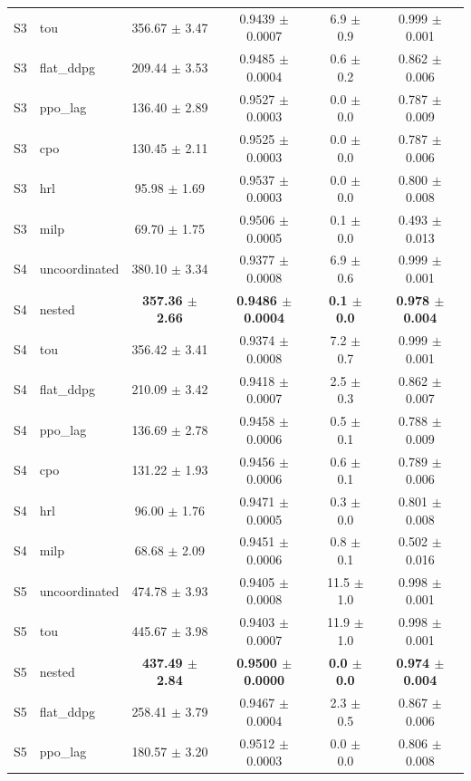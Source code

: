 \begin{tabular}{llcccc}
S3 & tou & 356.67 $\pm$ 3.47 & 0.9439 $\pm$ 0.0007 & 6.9 $\pm$ 0.9 & 0.999 $\pm$ 0.001 \\
S3 & flat_ddpg & 209.44 $\pm$ 3.53 & 0.9485 $\pm$ 0.0004 & 0.6 $\pm$ 0.2 & 0.862 $\pm$ 0.006 \\
S3 & ppo_lag & 136.40 $\pm$ 2.89 & 0.9527 $\pm$ 0.0003 & 0.0 $\pm$ 0.0 & 0.787 $\pm$ 0.009 \\
S3 & cpo & 130.45 $\pm$ 2.11 & 0.9525 $\pm$ 0.0003 & 0.0 $\pm$ 0.0 & 0.787 $\pm$ 0.006 \\
S3 & hrl & 95.98 $\pm$ 1.69 & 0.9537 $\pm$ 0.0003 & 0.0 $\pm$ 0.0 & 0.800 $\pm$ 0.008 \\
S3 & milp & 69.70 $\pm$ 1.75 & 0.9506 $\pm$ 0.0005 & 0.1 $\pm$ 0.0 & 0.493 $\pm$ 0.013 \\
\midrule
S4 & uncoordinated & 380.10 $\pm$ 3.34 & 0.9377 $\pm$ 0.0008 & 6.9 $\pm$ 0.6 & 0.999 $\pm$ 0.001 \\
S4 & nested & \textbf{357.36 $\pm$ 2.66} & \textbf{0.9486 $\pm$ 0.0004} & \textbf{0.1 $\pm$ 0.0} & \textbf{0.978 $\pm$ 0.004} \\
S4 & tou & 356.42 $\pm$ 3.41 & 0.9374 $\pm$ 0.0008 & 7.2 $\pm$ 0.7 & 0.999 $\pm$ 0.001 \\
S4 & flat_ddpg & 210.09 $\pm$ 3.42 & 0.9418 $\pm$ 0.0007 & 2.5 $\pm$ 0.3 & 0.862 $\pm$ 0.007 \\
S4 & ppo_lag & 136.69 $\pm$ 2.78 & 0.9458 $\pm$ 0.0006 & 0.5 $\pm$ 0.1 & 0.788 $\pm$ 0.009 \\
S4 & cpo & 131.22 $\pm$ 1.93 & 0.9456 $\pm$ 0.0006 & 0.6 $\pm$ 0.1 & 0.789 $\pm$ 0.006 \\
S4 & hrl & 96.00 $\pm$ 1.76 & 0.9471 $\pm$ 0.0005 & 0.3 $\pm$ 0.0 & 0.801 $\pm$ 0.008 \\
S4 & milp & 68.68 $\pm$ 2.09 & 0.9451 $\pm$ 0.0006 & 0.8 $\pm$ 0.1 & 0.502 $\pm$ 0.016 \\
\midrule
S5 & uncoordinated & 474.78 $\pm$ 3.93 & 0.9405 $\pm$ 0.0008 & 11.5 $\pm$ 1.0 & 0.998 $\pm$ 0.001 \\
S5 & tou & 445.67 $\pm$ 3.98 & 0.9403 $\pm$ 0.0007 & 11.9 $\pm$ 1.0 & 0.998 $\pm$ 0.001 \\
S5 & nested & \textbf{437.49 $\pm$ 2.84} & \textbf{0.9500 $\pm$ 0.0000} & \textbf{0.0 $\pm$ 0.0} & \textbf{0.974 $\pm$ 0.004} \\
S5 & flat_ddpg & 258.41 $\pm$ 3.79 & 0.9467 $\pm$ 0.0004 & 2.3 $\pm$ 0.5 & 0.867 $\pm$ 0.006 \\
S5 & ppo_lag & 180.57 $\pm$ 3.20 & 0.9512 $\pm$ 0.0003 & 0.0 $\pm$ 0.0 & 0.806 $\pm$ 0.008 \\

\end{tabular}
